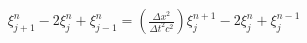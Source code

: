 \documentclass[preview]{standalone}
\begin{document}
\begin{align*}
\xi_{j+1}^{n} - 2 \xi_{j}^{n} + \xi_{j-1}^{n} =  (\frac{\Delta x^2}{\Delta t^2c^2}) \xi_{j}^{n+1} - 2 \xi_{j}^{n} + \xi_{j}^{n-1}
\end{align*}
\end{document}
